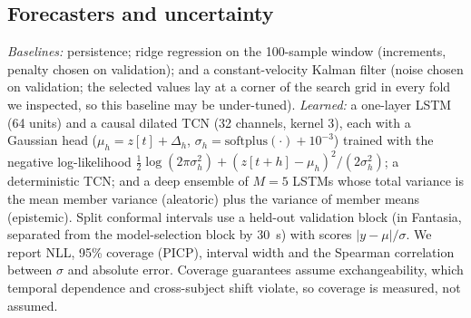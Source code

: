 \documentclass[conference]{IEEEtran}
\begin{document}
\subsection{Forecasters and uncertainty}
\emph{Baselines:} persistence; ridge regression on the 100-sample window (increments, penalty chosen on validation); and a constant-velocity Kalman filter %
(noise chosen on validation; the selected values lay at a corner of the search grid in every fold we inspected, so this baseline may be under-tuned). \emph{Learned:} a one-layer LSTM (64 units) and a causal dilated TCN (32 channels, kernel 3), each with a Gaussian head ($\mu_h=z[t]+\Delta_h$, $\sigma_h=\mathrm{softplus}(\cdot)+10^{-3}$) trained with the negative log-likelihood $\tfrac12\log(2\pi\sigma_h^2)+(z[t+h]-\mu_h)^2/(2\sigma_h^2)$; a deterministic TCN; and a deep ensemble of $M=5$ LSTMs whose total variance is the mean member variance (aleatoric) plus the variance of member means (epistemic). Split conformal intervals use a held-out validation block (in Fantasia, separated from the model-selection block by 30~s) with scores $|y-\mu|/\sigma$. We report NLL, 95\% coverage (PICP), interval width and the Spearman correlation between $\sigma$ and absolute error. Coverage guarantees assume exchangeability, which temporal dependence and cross-subject shift violate, so coverage is measured, not assumed.
\end{document}
